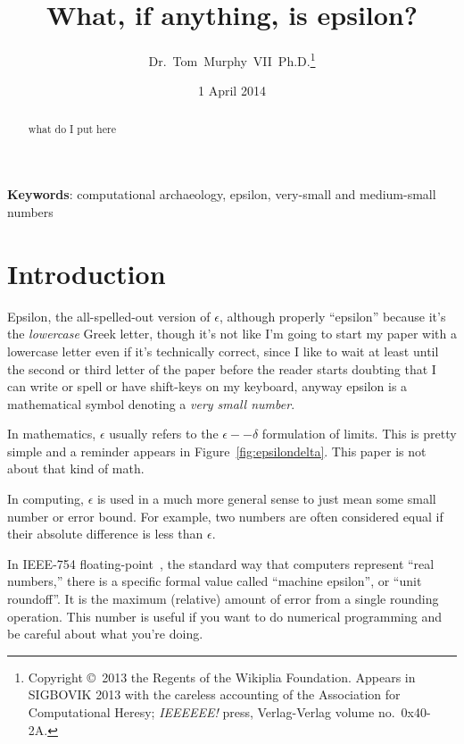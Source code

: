 \documentclass[twocolumn]{article}
\begin{document}
 

\title{What, if anything, is epsilon?}
\author{Dr.~Tom~Murphy~VII~Ph.D.\thanks{
Copyright \copyright\ 2013 the Regents of the Wikiplia
Foundation. Appears in SIGBOVIK 2013 with the careless accounting of the
Association for Computational Heresy; {\em IEEEEEE!} press,
Verlag-Verlag volume no.~0x40-2A.
}
}


\renewcommand\>{$>$}
\newcommand\<{$<$}

\date{1 April 2014}

\maketitle

\begin{abstract}
what do I put here
\end{abstract}

\vspace{1em}
{\noindent \small {\bf Keywords}:
 computational archaeology, epsilon, very-small and medium-small numbers
}

\section*{Introduction}

Epsilon, the all-spelled-out version of $\epsilon$, although properly
``epsilon'' because it's the {\em lowercase} Greek letter, though it's
not like I'm going to start my paper with a lowercase letter even if
it's technically correct, since I like to wait at least until the
second or third letter of the paper before the reader starts doubting
that I can write or spell or have shift-keys on my keyboard, anyway
epsilon is a mathematical symbol denoting a {\em very small number}.


In mathematics, $\epsilon$ usually refers to the
$\epsilon--\delta$ formulation of limits. This is pretty simple and a
reminder appears in Figure~\ref{fig:epsilondelta}. This paper is not
about that kind of math.

In computing, $\epsilon$ is used in a much more general sense to just
mean some small number or error bound. For example, two numbers are
often considered equal if their absolute difference is less than
$\epsilon$.

In IEEE-754 floating-point~\cite{ieee754}, the standard way that
computers represent ``real numbers,'' there is a specific formal value
called ``machine epsilon'', or ``unit roundoff''. It is the maximum
(relative) amount of error from a single rounding operation. This
number is useful if you want to do numerical programming and be
careful about what you're doing.
\end{document}
